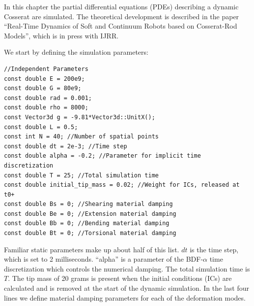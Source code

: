 \documentclass[12pt]{article}
\begin{document}
\makeatletter
\renewcommand{\@maketitle}{
\newpage
\null
\vskip 2em
\begin{center}
{\LARGE \@title \par}
\end{center}
\par
} \makeatother

\maketitle

In this chapter the partial differential equations (PDEs) describing a dynamic Cosserat are simulated. The theoretical development is described in the paper ``Real-Time Dynamics of Soft and Continuum Robots based on Cosserat-Rod Models'', which is in press with IJRR.

We start by defining the simulation parameters:
\begin{lstlisting}
//Independent Parameters
const double E = 200e9;
const double G = 80e9;
const double rad = 0.001;
const double rho = 8000;
const Vector3d g = -9.81*Vector3d::UnitX();
const double L = 0.5;
const int N = 40; //Number of spatial points
const double dt = 2e-3; //Time step
const double alpha = -0.2; //Parameter for implicit time discretization
const double T = 25; //Total simulation time
const double initial_tip_mass = 0.02; //Weight for ICs, released at t0+
const double Bs = 0; //Shearing material damping
const double Be = 0; //Extension material damping
const double Bb = 0; //Bending material damping
const double Bt = 0; //Torsional material damping
\end{lstlisting}
Familiar static parameters make up about half of this list. $dt$ is the time step, which is set to 2 milliseconds. ``alpha'' is a parameter of the BDF-$\alpha$ time discretization which controls the numerical damping. The total simulation time is $T$. The tip mass of 20 grams is present when the initial conditions (ICs) are calculated and is removed at the start of the dynamic simulation. In the last four lines we define material damping parameters for each of the deformation modes.
\end{document}
